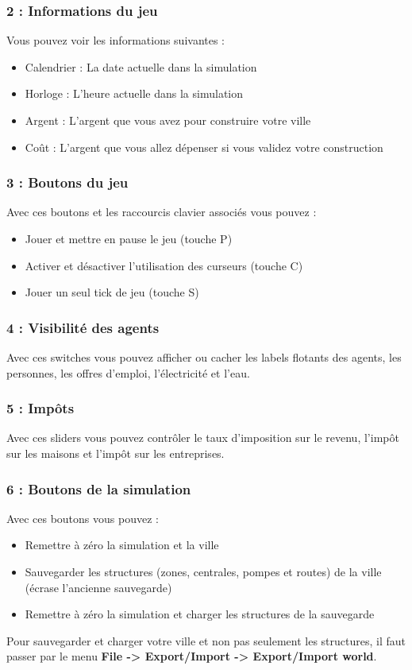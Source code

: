 \documentclass[11pt]{report}
\begin{document}
\subsubsection{2 : Informations du jeu}
Vous pouvez voir les informations suivantes :
\begin{itemize}
	\item Calendrier : La date actuelle dans la simulation
	\item Horloge : L'heure actuelle dans la simulation
	\item Argent : L'argent que vous avez pour construire votre ville
	\item Coût : L'argent que vous allez dépenser si vous validez votre construction
\end{itemize}

\subsubsection{3 : Boutons du jeu}
Avec ces boutons et les raccourcis clavier associés vous pouvez :
\begin{itemize}
	\item Jouer et mettre en pause le jeu (touche P)
	\item Activer et désactiver l'utilisation des curseurs (touche C)
	\item Jouer un seul tick de jeu (touche S)
\end{itemize}

\subsubsection{4 : Visibilité des agents}
Avec ces switches vous pouvez afficher ou cacher les labels flotants des agents, les personnes, les offres d'emploi, l'électricité et l'eau.

\subsubsection{5 : Impôts}
Avec ces sliders vous pouvez contrôler le taux d'imposition sur le revenu, l'impôt sur les maisons et l'impôt sur les entreprises.

\subsubsection{6 : Boutons de la simulation}
Avec ces boutons vous pouvez :
\begin{itemize}
	\item Remettre à zéro la simulation et la ville
	\item Sauvegarder les structures (zones, centrales, pompes et routes) de la ville (écrase l'ancienne sauvegarde)
	\item Remettre à zéro la simulation et charger les structures de la sauvegarde
\end{itemize}
Pour sauvegarder et charger votre ville et non pas seulement les structures, il faut passer par le menu \textbf{File -> Export/Import -> Export/Import world}.
\end{document}
